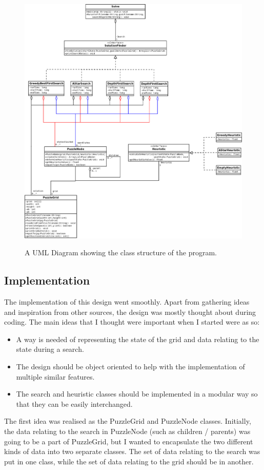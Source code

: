 \documentclass[12pt]{article}
\begin{document}
\begin{figure}[!h]
	\begin{center}
		\includegraphics[scale=0.3]{Images/UML_diagram.png}
		\label{fig:umldiag}
		\caption{A UML Diagram showing the class structure of the program.}
	\end{center}
\end{figure}

\subsection{Implementation}
The implementation of this design went smoothly. Apart from gathering ideas and inspiration from other sources, the design was mostly thought about during coding. The main ideas that I thought were important when I started were as so:
\begin{itemize}
	\item A way is needed of representing the state of the grid and data relating to the state during a search.
	\item The design should be object oriented to help with the implementation of multiple similar features.
	\item The search and heuristic classes should be implemented in a modular way so that they can be easily interchanged.
\end{itemize}
The first idea was realised as the PuzzleGrid and PuzzleNode classes. Initially, the data relating to the search in PuzzleNode (such as children / parents) was going to be a part of PuzzleGrid, but I wanted to encapsulate the two different kinds of data into two separate classes. The set of data relating to the search was put in one class, while the set of data relating to the grid should be in another.
\end{document}
